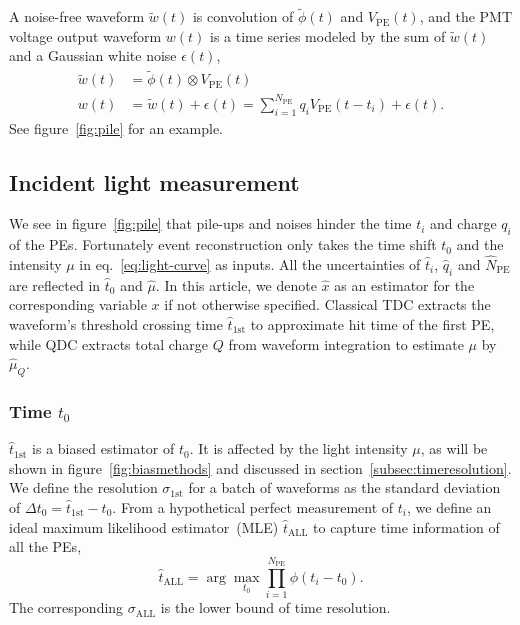A noise-free waveform $\tilde{w}(t)$ is convolution of $\tilde{\phi}(t)$ and $V_\mathrm{PE}(t)$, and the PMT voltage output waveform $w(t)$ is a time series modeled by the sum of $\tilde{w}(t)$ and a Gaussian white noise $\epsilon(t)$,
\begin{equation}
  \label{eq:1}
  \begin{aligned}
    \tilde{w}(t) &= \tilde{\phi}(t) \otimes V_\mathrm{PE}(t) \\
    w(t) &= \tilde{w}(t) + \epsilon(t) = \sum_{i=1}^{N_\mathrm{PE}} q_i V_\mathrm{PE}(t-t_i) + \epsilon(t).
  \end{aligned}
\end{equation}
See figure~\ref{fig:pile} for an example.


\subsection{Incident light measurement}
\label{sec:time}
We see in figure~\ref{fig:pile} that pile-ups and noises hinder the time $t_i$ and charge $q_i$ of the PEs. Fortunately event reconstruction only takes the time shift $t_0$ and the intensity $\mu$ in eq.~\eqref{eq:light-curve} as inputs.  All the uncertainties of $\hat{t}_i$, $\hat{q}_i$ and $\hat{N}_\mathrm{PE}$ are reflected in $\hat{t}_0$ and $\hat{\mu}$. In this article, we denote $\hat{x}$ as an estimator for the corresponding variable $x$ if not otherwise specified.  Classical TDC extracts the waveform's threshold crossing time $\hat{t}_\mathrm{1st}$ to approximate hit time of the first PE, while QDC extracts total charge $Q$ from waveform integration to estimate $\mu$ by $\hat{\mu}_Q$.

\subsubsection{Time $t_0$}
\label{sec:time-shift-t_0}

$\hat{t}_\mathrm{1st}$ is a biased estimator of $t_0$.  It is affected by the light intensity $\mu$, as will be shown in figure~\ref{fig:biasmethods} and discussed in section~\ref{subsec:timeresolution}. We define the resolution $\sigma_\mathrm{1st}$ for a batch of waveforms as the standard deviation of $\Delta t_0 = \hat{t}_\mathrm{1st} - t_0$. From a hypothetical perfect measurement of $t_i$, we define an ideal maximum likelihood estimator~(MLE) $\hat{t}_\mathrm{ALL}$ to capture time information of all the PEs,
\begin{equation}
  \label{eq:2}
  \hat{t}_\mathrm{ALL} = \arg\underset{t_0}{\max} \prod_{i=1}^{N_\mathrm{PE}} \phi(t_i-t_0).
\end{equation}
The corresponding $\sigma_\mathrm{ALL}$ is the lower bound of time resolution. 

